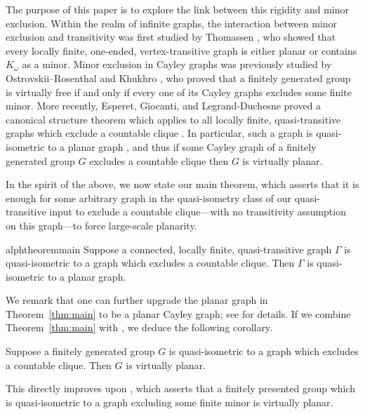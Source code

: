 \documentclass[a4paper]{amsart}
\begin{document}
The purpose of this paper is to explore the link between this rigidity and minor exclusion. 
Within the realm of infinite graphs, the interaction between minor exclusion and transitivity was first studied by Thomassen \cite{Tho92}, who showed that every locally finite, one-ended, vertex-transitive graph is either planar or contains $K_{\omega}$ as a minor. Minor exclusion in Cayley graphs was previously studied by Ostrovskii–Rosenthal \cite{OR15} and Khukhro \cite{Khu23}, who proved that a finitely generated group is virtually free if and only if every one of its Cayley graphs excludes some finite minor.
More recently, Esperet, Giocanti, and Legrand-Duchesne proved a canonical structure theorem which applies to all locally finite, quasi-transitive graphs which exclude a countable clique \cite{esperet2024structure}. In particular, such a graph is quasi-isometric to a planar graph \cite{Esperet_Giocanti_2024}, and thus if some Cayley graph of a finitely generated group $G$ excludes a countable clique then $G$ is virtually planar. 

In the spirit of the above, we now state our main theorem, which asserts that it is enough for some arbitrary graph in the quasi-isometry class of our quasi-transitive input to exclude a countable clique---with no transitivity assumption on this graph---to force large-scale planarity.

\begin{restatable}{alphtheorem}{main}\label{thm:main}
    Suppose a connected, locally finite, quasi-transitive graph $\Gamma$
    is quasi-isometric to a graph which excludes a countable clique.
    Then $\Gamma$ is quasi-isometric to a planar graph.
\end{restatable}

We remark that one can further upgrade
the planar graph in Theorem~\ref{thm:main} to be a planar Cayley graph;
see \cite{macmanus2024note} for details. 
If we combine Theorem~\ref{thm:main} with
\cite[Cor.~D]{macmanus2023accessibility}, we deduce the following corollary.

\begin{alphcor}\label{cor:planar-rigidity}
    Suppose a finitely generated group $G$ is quasi-isometric to a graph
    which excludes a countable clique. Then $G$ is virtually planar.
\end{alphcor}

This directly improves upon \cite[Cor.~B]{macmanus2025fat}, which asserts that a finitely presented group which is quasi-isometric to a graph excluding some finite minor is virtually planar. 
\end{document}
